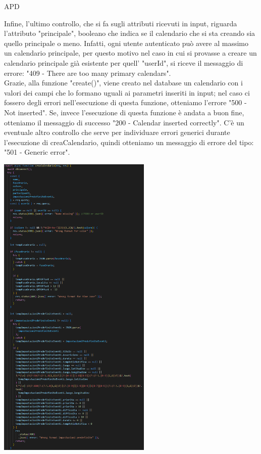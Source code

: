 \begin{listaPersonale} {APD}
\begin{listaPersonale2}[APD]{}
                Infine, l'ultimo controllo, che si fa sugli attributi ricevuti in input, riguarda l'attributo "principale", booleano che indica se il calendario che si sta creando sia quello principale o meno. Infatti, ogni utente autenticato può avere al massimo un calendario principale, per questo motivo nel caso in cui si provasse a creare un calendario principale già esistente per quell' "userId", si riceve il messaggio di errore: "409 - There are too many primary calendars". \\
                Grazie, alla funzione "create()", viene creato nel database un calendario con i valori dei campi che lo formano uguali ai parametri inseriti in input; nel caso ci fossero degli errori nell'esecuzione di questa funzione, otteniamo l'errore "500 - Not inserted". Se, invece l'esecuzione di questa funzione è andata a buon fine, otteniamo il messaggio di successo "200 - Calendar inserted correctly". C'è un eventuale altro controllo che serve per individuare errori generici durante l'esecuzione di creaCalendario, quindi otteniamo un messaggio di errore del tipo: "501 - Generic error".
                \begin{center}
                    \includegraphics[width=0.55\textwidth, height=0.80\textheight]{img/png/APIs/creaCalendario.png}

\end{center}
\end{listaPersonale2}
\end{listaPersonale}
